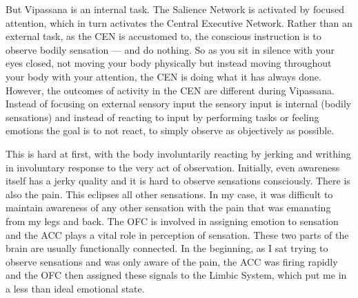 \documentclass[a4paper, amsfonts, amssymb, amsmath, reprint, showkeys, nofootinbib, twoside]{revtex4-1}
\begin{document}
But Vipassana is an internal task. The Salience Network is activated by focused
attention, which in turn activates the Central Executive Network. Rather than an
external task, as the CEN is accustomed to, the conscious instruction is to observe
bodily sensation --- and do nothing. So as you sit in silence with your eyes closed,
not moving your body physically but instead moving throughout your body with your
attention, the CEN is doing what it has always done. However, the outcomes of
activity in the CEN are different during Vipassana. Instead of focusing on
external sensory input the sensory input is internal (bodily sensations) and instead
of reacting to input by performing tasks or feeling emotions the goal is to not
react, to simply observe as objectively as possible.

This is hard at first, with the body involuntarily reacting by jerking and writhing
in involuntary response to the very act of observation. Initially, even awareness
itself has a jerky quality and it is hard to observe sensations consciously. There is also the
pain. This eclipses all other sensations. In my case, it was difficult to maintain
awareness of any other sensation with the pain that was emanating from my legs and
back. The OFC is involved in assigning emotion to sensation \cite{ofcemotion} and the
ACC plays a vital role in perception of sensation. These two parts of the brain are
usually functionally connected. In the beginning, as I sat trying to observe
sensations and was only aware of the pain, the ACC was firing rapidly and the
OFC then assigned these signals to the Limbic System, which
put me in a less than ideal emotional state.
\end{document}
